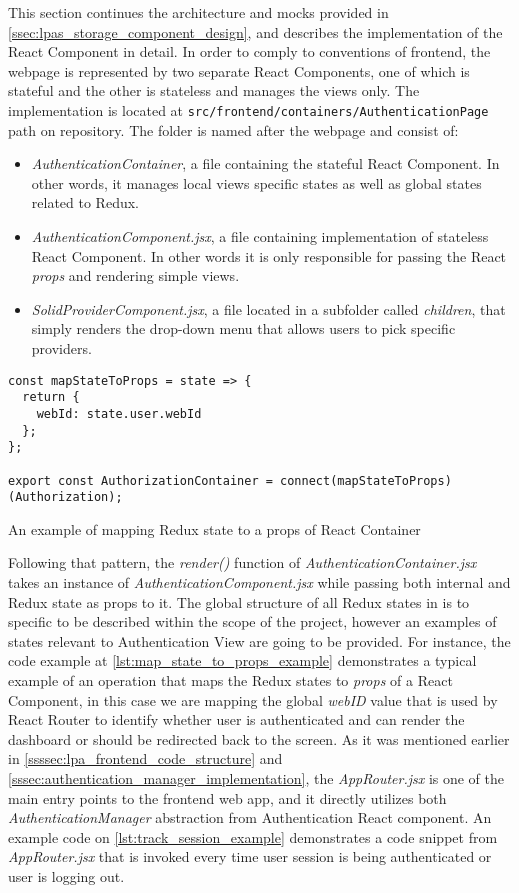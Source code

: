 This section continues the architecture and mocks provided in \autoref{ssec:lpas_storage_component_design}, and describes the implementation of the React Component in detail.
In order to comply to conventions of \lpa{} frontend, the webpage is represented by two separate React Components, one of which is stateful and the other is stateless and manages the views only. The implementation is located at \texttt{src/frontend/containers/AuthenticationPage} path on \lpa{} repository. The folder is named after the webpage and consist of:
\begin{itemize}
	\item \textit{AuthenticationContainer}, a file containing the stateful React Component. In other words, it manages local views specific states as well as global states related to Redux.
	\item \textit{AuthenticationComponent.jsx}, a file containing implementation of stateless React Component. In other words it is only responsible for passing the React \textit{props} and rendering simple views.
	\item \textit{SolidProviderComponent.jsx}, a file located in a subfolder called \textit{children}, that simply renders the drop-down menu that allows users to pick specific providers.
\end{itemize}

\begin{listing}[H]    
\begin{verbatim}
const mapStateToProps = state => {
  return {
    webId: state.user.webId
  };
};

export const AuthorizationContainer = connect(mapStateToProps)(Authorization);
\end{verbatim}
\caption{An example of mapping Redux state to a props of React Container} 
\label{lst:map_state_to_props_example}
\end{listing}

Following that pattern, the \textit{render()} function of \textit{AuthenticationContainer.jsx} takes an instance of \textit{AuthenticationComponent.jsx} while passing both internal and Redux state as props to it. The global structure of all Redux states in \lpa{} is to specific to be described within the scope of the \lpas{} project, however an examples of states relevant to Authentication View are going to be provided. For instance, the code example at \autoref{lst:map_state_to_props_example} demonstrates a typical example of an operation that maps the Redux states to \textit{props} of a React Component, in this case we are mapping the global \textit{webID} value that is used by React Router to identify whether user is authenticated and can render the dashboard or should be redirected back to the screen. As it was mentioned earlier in \autoref{ssssec:lpa_frontend_code_structure} and \autoref{sssec:authentication_manager_implementation}, the \textit{AppRouter.jsx} is one of the main entry points to the frontend web app, and it directly utilizes both \textit{AuthenticationManager} abstraction from Authentication React component. An example code on \autoref{lst:track_session_example} demonstrates a code snippet from \textit{AppRouter.jsx} that is invoked every time user session is being authenticated or user is logging out.

